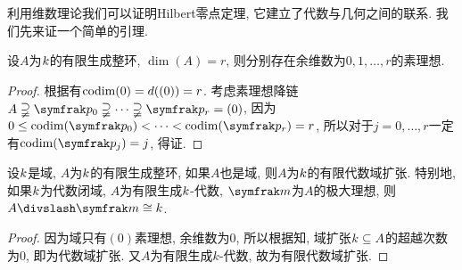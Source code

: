 利用维数理论我们可以证明Hilbert零点定理, 它建立了代数与几何之间的联系. 我们先来证一个简单的引理.

\begin{proposition}\label{prop:ringdimprimeidealexist}
  设$A$为$k$的有限生成整环, $\dim (A)=r$, 则分别存在余维数为$0, 1, \dotsc, r$的素理想.
\end{proposition}

\begin{proof}
  根据有$\operatorname{codim} (0)=d((0))=r$. 考虑素理想降链$A\supsetneqq \ideal{p}_0\supsetneqq \dotsb\supsetneqq \ideal{p}_r=(0)$, 因为$0\leq \codim (\ideal{p}_0)< \dotsb <\codim (\ideal{p}_r)=r$, 所以对于$j=0, \dotsc, r$一定有$\codim (\ideal{p}_j)=j$, 得证.
\end{proof}

\begin{theorem}\label{thm:hilbert-nullstellensatz-weak}
  设$k$是域, $A$为$k$的有限生成整环, 如果$A$也是域, 则$A$为$k$的有限代数域扩张. 特别地, 如果$k$为代数闭域, $A$为有限生成$k$-代数, $\ideal{m}$为$A$的极大理想, 则$A{\divslash}\ideal{m}\cong \field{k}$.
\end{theorem}

\begin{proof}
  因为域只有$(0)$素理想, 余维数为0, 所以根据知, 域扩张$k\subseteq A$的超越次数为0, 即为代数域扩张. 又$A$为有限生成$k$-代数, 故为有限代数域扩张.
\end{proof}







